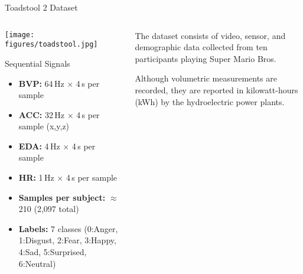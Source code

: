 \begin{frame}{Toadstool 2 Dataset}
	\begin{columns}[T] %
		\begin{column}{0.45\textwidth}
			\texttt{[image: figures/toadstool.jpg]}
			\vspace{0.5cm}
			\begin{block}{Sequential Signals}
				\begin{itemize}
					\item \textbf{BVP:} 64\,Hz $\times$ 4\,s per sample
					\item \textbf{ACC:} 32\,Hz $\times$ 4\,s per sample (x,y,z)
					\item \textbf{EDA:} 4\,Hz $\times$ 4\,s per sample
					\item \textbf{HR:} 1\,Hz $\times$ 4\,s per sample
					\item \textbf{Samples per subject:} $\approx$210 (2,097 total)
					\item \textbf{Labels:} 7 classes (0:Anger, 1:Disgust, 2:Fear, 3:Happy, 4:Sad, 5:Surprised, 6:Neutral)
				\end{itemize}
			\end{block}
		\end{column}
		\begin{column}{0.55\textwidth}
			\begin{block}{}
				The dataset consists of video, sensor, and demographic data collected from ten participants playing Super Mario Bros.
			\end{block}
			
			\begin{block}{}
				Although volumetric measurements are recorded, they are reported in kilowatt-hours (kWh) by the hydroelectric power plants.
			\end{block}
		\end{column}
	\end{columns}
\end{frame}

